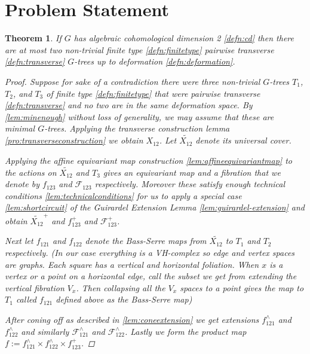\documentclass{article}
\theoremstyle{mystyle}
\newtheorem{thm}{Theorem}[section]
\theoremstyle{remark}
\begin{document}
\section{Problem Statement}

\begin{thm}
    If \(G\) has algebraic cohomological dimension 2 \ref{defn:cd}  then there are at most two non-trivial finite type \ref{defn:finitetype} pairwise transverse \ref{defn:transverse} \(G\)-trees up to deformation \ref{defn:deformation}.
    \begin{proof}
        Suppose for sake of a contradiction there were three non-trivial \(G\)-trees \(T_{1}\), \(T_{2}\), and \(T_{3}\) of finite type \ref{defn:finitetype} that were pairwise transverse \ref{defn:transverse} and no two are in the same deformation space. By \ref{lem:minenough} without loss of generality, we may assume that these are minimal \(G\)-trees.  Applying the transverse construction lemma \ref{pro:transverseconstruction} we obtain \(X_{12}\). Let \(\widetilde {X_{12}}\) denote its universal cover. 
        
        Applying the affine equivariant map construction \ref{lem:affineequivariantmap} to the actions on \(\widetilde {X_{12}}\) and \(T_{3}\) gives an equivariant  map and a fibration that we denote by \(f_{123}\) and \(\mathscr{F}_{123}\) respectively. Moreover these satisfy enough technical conditions \ref{lem:technicalconditions} for us to apply a special case \ref{lem:shortcircuit} of the Guirardel Extension Lemma \ref{lem:guirardel-extension} and obtain \(\widetilde{X_{12}}^{+}\) and \(f_{123}^{+}\) and \(\mathscr{F}_{123}^{+}\).

        Next let  \(f_{121}\) and  \(f_{122}\)  denote the Bass-Serre maps from \(\widetilde {X_{12}}\) to \(T_{1}\) and \(T_{2}\) respectively. (In our case everything is a VH-complex so edge and vertex spaces are graphs. Each square has a vertical and horizontal foliation. When $x$ is a vertex or a point on a horizontal edge, call the subset we get from extending the vertical fibration $V_x$. Then collapsing all the $V_x$ spaces to a point gives the map to $T_1$ called \(f_{121}\) defined above as the Bass-Serre map)
        
        After coning off as described in \ref{lem:coneextension} we get extensions \(f_{121}^{\wedge}\) and \(f_{122}^{\wedge}\) and similarly \(\mathscr{F}^{\wedge}_{121}\) and \(\mathscr{F}^{\wedge}_{122}\). Lastly we form the product map \(f:= f_{121}^{\wedge} \times f_{122}^{\wedge} \times f_{123}^{+}\). 


\end{proof}
\end{thm}
\end{document}
